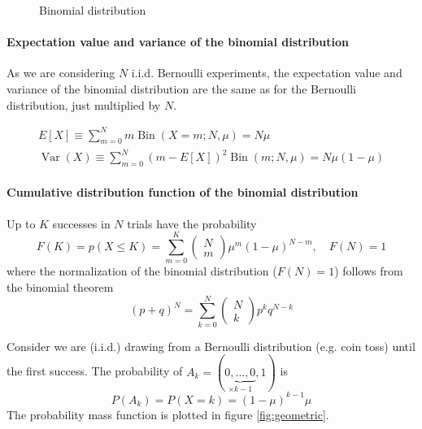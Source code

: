 \begin{figure}[!htb]
    \centering
    
    \caption{Binomial distribution}
    \label{fig:binomial}
\end{figure}


\paragraph*{Expectation value and variance of the binomial distribution} As we are considering
$N$ i.i.d. Bernoulli experiments, the expectation value and variance of the binomial distribution
are the same as for the Bernoulli distribution, just multiplied by $N$.

\begin{equation}
    \begin{gathered}
    E[X] \equiv \sum_{m=0}^N m \operatorname{Bin}(X=m ; N, \mu)=N \mu \\
    \operatorname{Var}(X) \equiv \sum_{m=0}^N(m-E[X])^2 \operatorname{Bin}(m ; N, \mu)=N \mu(1-\mu)
    \end{gathered}
\end{equation}

\paragraph*{Cumulative distribution function of the binomial distribution}
Up to $K$ successes in $N$ trials have the probability
\begin{equation}
    F(K)=p(X \leq K)=\sum_{m=0}^K\left(\begin{array}{l}
    N \\
    m
    \end{array}\right) \mu^m(1-\mu)^{N-m}, \quad F(N)=1
\end{equation}
where the normalization of the binomial distribution
($F(N) = 1$) follows from the binomial theorem
\begin{equation}
    (p+q)^N=\sum_{k=0}^N\left(\begin{array}{l}
    N \\
    k
    \end{array}\right) p^k q^{N-k}
\end{equation}

Consider we are (i.i.d.) drawing from a Bernoulli distribution (e.g. coin toss) until the first success.
The probability of $A_k = (\underbrace{0,\dots,0}_{\times k-1},1)$ is
\begin{equation}
    P(A_k) = P(X=k) = (1-\mu)^{k-1} \mu
\end{equation}
The probability mass function is plotted in figure \ref{fig:geometric}.


